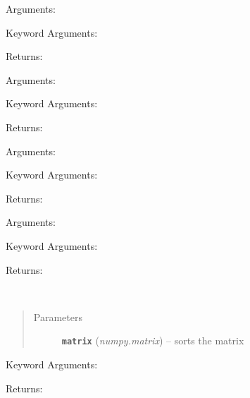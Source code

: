 \documentclass[letterpaper,10pt,english]{sphinxmanual}
\begin{document}

\begin{fulllineitems}
\label{retr:retr.__rho2hex}
Arguments:

Keyword Arguments:

Returns:

\end{fulllineitems}


\begin{fulllineitems}
\label{retr:retr.__rotateAlpha}
Arguments:

Keyword Arguments:

Returns:

\end{fulllineitems}


\begin{fulllineitems}
\label{retr:retr.__rotateBeta}
Arguments:

Keyword Arguments:

Returns:

\end{fulllineitems}


\begin{fulllineitems}
\label{retr:retr.__rotateGamma}
Arguments:

Keyword Arguments:

Returns:

\end{fulllineitems}


\begin{fulllineitems}
\label{retr:retr.__shiftAfter}~\begin{quote}\begin{description}
\item[{Parameters}] \leavevmode
\textbf{\texttt{matrix}} (\emph{numpy.matrix}) -- sorts the matrix

\end{description}\end{quote}

Keyword Arguments:

Returns:

\end{fulllineitems}
\end{document}
